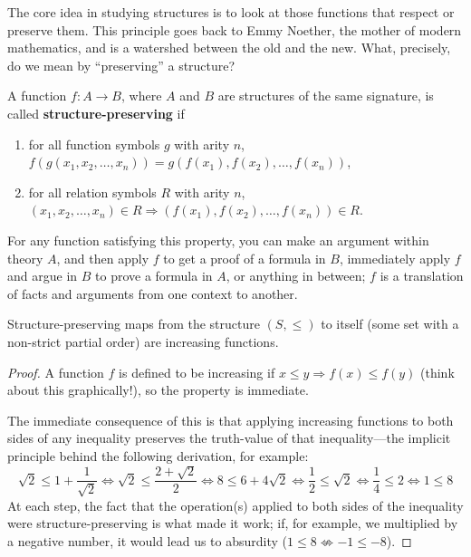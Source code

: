 The core idea in studying structures is to look at those functions that respect or preserve them.
This principle goes back to Emmy Noether, the mother of modern mathematics, and is a watershed between the old and the new.
What, precisely, do we mean by ``preserving'' a structure?

\begin{definition}
  A function $f: A \to B$, where $A$ and $B$ are structures of the same signature, is called \textbf{structure-preserving} if
  \begin{enumerate}
  \item for all function symbols $g$ with arity $n$, $f(g(x_{1}, x_{2}, \ldots, x_{n})) = g(f(x_{1}), f(x_{2}), \ldots, f(x_{n}))$,
  \item for all relation symbols $R$ with arity $n$, $(x_{1}, x_{2}, \ldots, x_{n}) \in R \Rightarrow (f(x_{1}), f(x_{2}), \ldots, f(x_{n})) \in R$.
  \end{enumerate}
\end{definition}

For any function satisfying this property, you can make an argument within theory $A$, and then apply $f$ to get a proof of a formula in $B$,
immediately apply $f$ and argue in $B$ to prove a formula in $A$, or anything in between;
$f$ is a translation of facts and arguments from one context to another.

\begin{exam}
  Structure-preserving maps from the structure $(S, \leq)$ to itself (some set with a non-strict partial order) are increasing functions.
\end{exam}

\begin{proof}
  A function $f$ is defined to be increasing if $x \leq y \Rightarrow f(x) \leq f(y)$ (think about this graphically!),
  so the property is immediate.

  The immediate consequence of this is that applying increasing functions to both sides of any inequality preserves the truth-value
  of that inequality---the implicit principle behind the following derivation, for example:
  \[
    \sqrt{2} \leq 1 + \frac{1}{\sqrt{2}} \Leftrightarrow \sqrt{2} \leq \frac{2 + \sqrt{2}}{2}
    \Leftrightarrow 8 \leq 6 + 4 \sqrt{2} \Leftrightarrow \frac{1}{2} \leq \sqrt{2} \Leftrightarrow \frac{1}{4} \leq 2
    \Leftrightarrow 1 \leq 8
  \]
  At each step, the fact that the operation(s) applied to both sides of the inequality were structure-preserving is what made it work;
  if, for example, we multiplied by a negative number, it would lead us to absurdity ($1 \leq 8 \not\Leftrightarrow -1 \leq -8$).
\end{proof}


